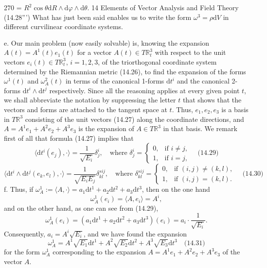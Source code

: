 270 = $R^2 \cos \theta \mathrm{d}R \wedge \mathrm{d}\varphi \wedge \mathrm{d}\theta.$
14 Elements of Vector Analysis and Field Theory
(14.28''')
What has just been said enables us to write the form $\omega^3 = \rho \mathrm{d}V$ in different
curvilinear coordinate systems.

e.
Our main problem (now easily solvable) is, knowing the expansion $A(t) =
A^1(t)e_1(t)$ for a vector $A(t) \in T\mathbb{R}^3_t$ with respect to the unit vectors $e_i(t) \in T\mathbb{R}^3_t$,
$i = 1, 2, 3$, of the triorthogonal coordinate system determined by the Riemannian
metric (14.26), to find the expansion of the forms $\omega^1(t)$ and $\omega^2_A(t)$ in terms of the
canonical 1-forms $\mathrm{d}t^i$ and the canonical 2-forms $\mathrm{d}t^i \wedge \mathrm{d}t^j$ respectively.
Since all the reasoning applies at every given point $t$, we shall abbreviate the
notation by suppressing the letter $t$ that shows that the vectors and forms are attached
to the tangent space at $t$.
Thus, $e_1, e_2, e_3$ is a basis in $T\mathbb{R}^3$ consisting of the unit vectors (14.27) along the
coordinate directions, and $A = A^1e_1 + A^2e_2 + A^3e_3$ is the expansion of $A \in T\mathbb{R}^3$
in that basis.
We remark first of all that formula (14.27) implies that
$$\langle \mathrm{d}t^i (e_j), \cdot \rangle = \frac{1}{\sqrt{E_i}}\delta^i_j, \quad \text{where } \delta^i_j = \begin{cases} 0, & \text{if } i \neq j, \\ 1, & \text{if } i = j, \end{cases} \quad \text{(14.29)}$$
$$\langle \mathrm{d}t^i \wedge \mathrm{d}t^j (e_k, e_l), \cdot \rangle = \frac{1}{\sqrt{E_i E_j}}\delta^{sij}_{kl}, \quad \text{where } \delta^{sij}_{kl} = \begin{cases} 0, & \text{if } (i, j) \neq (k, l), \\ 1, & \text{if } (i, j) = (k, l). \end{cases} \quad \text{(14.30)}$$
f.
Thus, if $\omega^1_A := \langle A, \cdot \rangle = a_1 \mathrm{d}t^1 + a_2 \mathrm{d}t^2 + a_3 \mathrm{d}t^3$, then on the one hand
$$\omega^1_A(e_i) = \langle A, e_i \rangle = A^i,$$
and on the other hand, as one can see from (14.29),
$$\omega^1_A(e_i) = (a_1 \mathrm{d}t^1 + a_2 \mathrm{d}t^2 + a_3 \mathrm{d}t^3)(e_i) = a_i \cdot \frac{1}{\sqrt{E_i}}.$$
Consequently, $a_i = A^i \sqrt{E_i}$, and we have found the expansion
$$\omega^1_A = A^1\sqrt{E_1} \mathrm{d}t^1 + A^2\sqrt{E_2} \mathrm{d}t^2 + A^3\sqrt{E_3} \mathrm{d}t^3 \quad \text{(14.31)}$$
for the form $\omega^1_A$ corresponding to the expansion $A = A^1e_1 + A^2e_2 + A^3e_3$ of the
vector $A$.